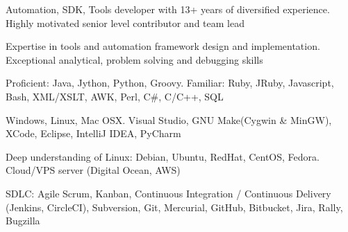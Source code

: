\documentclass[11pt, a4paper]{awesome-cv}
\begin{document}
\makecvheader

\makecvfooter
  {}
  {}
  {\thepage}


\begin{cventries}

  \cventry
    {}
    {}
    {}
    {}
    {
      \begin{cvitems} 
        \item {Automation, SDK, Tools developer with 13+ years of diversified experience. Highly motivated senior level contributor and team lead}
        \item {Expertise in tools and automation framework design and implementation. Exceptional analytical, problem solving and debugging skills}
        \item {Proficient: Java, Jython, Python, Groovy. Familiar: Ruby, JRuby, Javascript, Bash, XML/XSLT, AWK, Perl, C\#, C/C++, SQL}
        \item {Windows, Linux, Mac OSX. Visual Studio, GNU Make(Cygwin \& MinGW), XCode, Eclipse, IntelliJ IDEA, PyCharm}
        \item {Deep understanding of Linux: Debian, Ubuntu, RedHat, CentOS, Fedora. Cloud/VPS server (Digital Ocean, AWS)}
        \item {SDLC: Agile Scrum, Kanban, Continuous Integration / Continuous Delivery (Jenkins, CircleCI), Subversion, Git, Mercurial, GitHub, Bitbucket, Jira, Rally, Bugzilla}
      \end{cvitems}
    }

\end{cventries}
\end{document}
